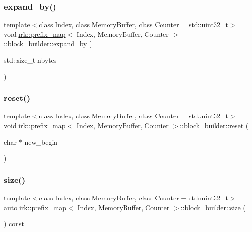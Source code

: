\subsubsection{\texorpdfstring{expand\+\_\+by()}{expand\_by()}}
{\footnotesize\ttfamily template$<$class Index, class Memory\+Buffer, class Counter = std\+::uint32\+\_\+t$>$ \\
void \mbox{\hyperlink{classirk_1_1prefix__map}{irk\+::prefix\+\_\+map}}$<$ Index, Memory\+Buffer, Counter $>$\+::block\+\_\+builder\+::expand\+\_\+by (\begin{DoxyParamCaption}\item[{std\+::size\+\_\+t}]{nbytes }\end{DoxyParamCaption})\hspace{0.3cm}{\ttfamily [inline]}}

\mbox{\label{classirk_1_1prefix__map_1_1block__builder_aa25610a99626d90e1b3232fc05fe58cb}} 
\subsubsection{\texorpdfstring{reset()}{reset()}}
{\footnotesize\ttfamily template$<$class Index, class Memory\+Buffer, class Counter = std\+::uint32\+\_\+t$>$ \\
void \mbox{\hyperlink{classirk_1_1prefix__map}{irk\+::prefix\+\_\+map}}$<$ Index, Memory\+Buffer, Counter $>$\+::block\+\_\+builder\+::reset (\begin{DoxyParamCaption}\item[{char $\ast$}]{new\+\_\+begin }\end{DoxyParamCaption})\hspace{0.3cm}{\ttfamily [inline]}}

\mbox{\label{classirk_1_1prefix__map_1_1block__builder_ac3fb0a31f627e1f49b9eb0738742dd23}} 
\subsubsection{\texorpdfstring{size()}{size()}}
{\footnotesize\ttfamily template$<$class Index, class Memory\+Buffer, class Counter = std\+::uint32\+\_\+t$>$ \\
auto \mbox{\hyperlink{classirk_1_1prefix__map}{irk\+::prefix\+\_\+map}}$<$ Index, Memory\+Buffer, Counter $>$\+::block\+\_\+builder\+::size (\begin{DoxyParamCaption}{ }\end{DoxyParamCaption}) const\hspace{0.3cm}{\ttfamily [inline]}}

